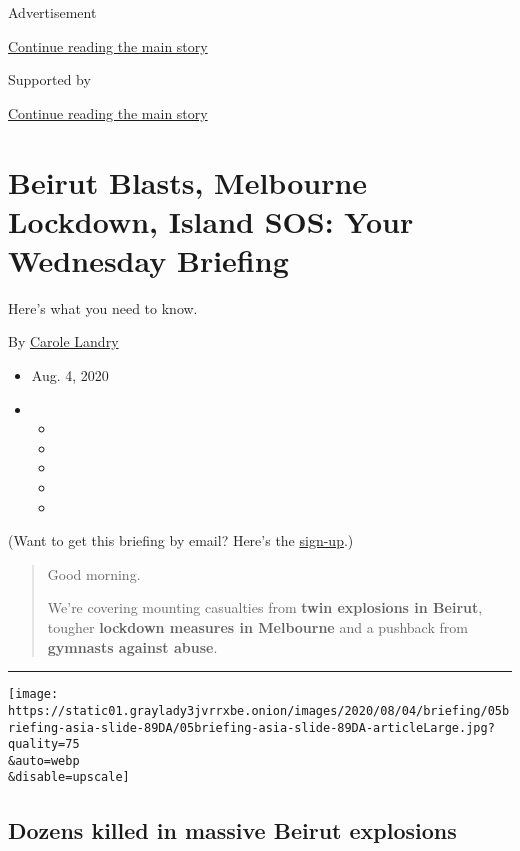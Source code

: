 Advertisement

\protect\hyperlink{after-top}{Continue reading the main story}

Supported by

\protect\hyperlink{after-sponsor}{Continue reading the main story}

\hypertarget{beirut-blasts-melbourne-lockdown-island-sos-your-wednesday-briefing}{%
\section{Beirut Blasts, Melbourne Lockdown, Island SOS: Your Wednesday
Briefing}\label{beirut-blasts-melbourne-lockdown-island-sos-your-wednesday-briefing}}

Here's what you need to know.

By \href{https://www.nytimes3xbfgragh.onion/by/carole-landry}{Carole
Landry}

\begin{itemize}
\item
  Aug. 4, 2020
\item
  \begin{itemize}
  \item
  \item
  \item
  \item
  \item
  \end{itemize}
\end{itemize}

(Want to get this briefing by email? Here's the
\href{https://www.nytimes3xbfgragh.onion/morning-briefing}{sign-up}.)

\begin{quote}
Good morning.

We're covering mounting casualties from \textbf{twin explosions in
Beirut}, tougher \textbf{lockdown measures in Melbourne} and a pushback
from \textbf{gymnasts against abuse}.
\end{quote}

\begin{center}\rule{0.5\linewidth}{\linethickness}\end{center}

\texttt{[image: https://static01.graylady3jvrrxbe.onion/images/2020/08/04/briefing/05briefing-asia-slide-89DA/05briefing-asia-slide-89DA-articleLarge.jpg?quality=75\\\&auto=webp\\\&disable=upscale]}

\hypertarget{dozens-killed-in-massive-beirut-explosions}{%
\subsection{Dozens killed in massive Beirut
explosions}\label{dozens-killed-in-massive-beirut-explosions}}

